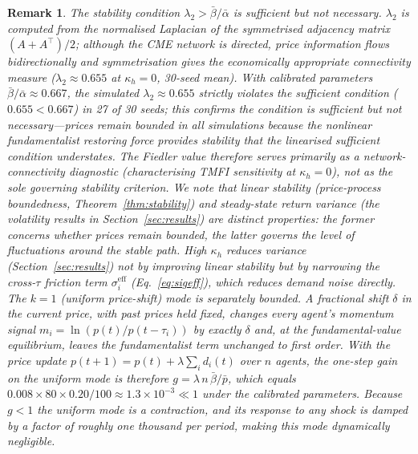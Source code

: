 \documentclass[preprint,12pt,authoryear]{elsarticle}
\newtheorem{remark}{Remark}
\begin{document}
\begin{remark}
The stability condition $\lambda_2 > \bar{\beta}/\bar{\alpha}$ is
\emph{sufficient but not necessary}.
$\lambda_2$ is computed from the normalised Laplacian of the symmetrised
adjacency matrix $(A + A^\top)/2$; although the CME network is directed,
price information flows bidirectionally and symmetrisation gives the
economically appropriate connectivity measure
($\lambda_2 \approx 0.655$ at $\kappa_h = 0$, 30-seed mean).
With calibrated parameters $\bar{\beta}/\bar{\alpha} \approx 0.667$, the
simulated $\lambda_2 \approx 0.655$ strictly violates the sufficient
condition ($0.655 < 0.667$) in 27 of 30 seeds; this confirms the condition
is sufficient but not necessary---prices remain bounded in all simulations
because the nonlinear fundamentalist restoring force provides stability that
the linearised sufficient condition understates.
The Fiedler value therefore serves primarily as a network-connectivity
diagnostic (characterising TMFI sensitivity at $\kappa_h = 0$), not as
the sole governing stability criterion.
We note that linear stability (price-process boundedness, Theorem~\ref{thm:stability})
and steady-state return variance (the volatility results in Section~\ref{sec:results})
are distinct properties: the former concerns whether prices remain bounded,
the latter governs the level of fluctuations around the stable path.
High $\kappa_h$ reduces variance (Section~\ref{sec:results}) not by
improving linear stability but by narrowing the cross-$\tau$ friction term
$\sigma_i^{\text{eff}}$ (Eq.~\eqref{eq:sigeff}), which reduces demand noise
directly.
The $k = 1$ (uniform price-shift) mode is separately bounded.
A fractional shift $\delta$ in the current price, with past prices held fixed,
changes every agent's momentum signal $m_i = \ln(p(t)/p(t-\tau_i))$ by exactly
$\delta$ and, at the fundamental-value equilibrium, leaves the fundamentalist
term unchanged to first order.
With the price update $p(t{+}1) = p(t) + \lambda\sum_i d_i(t)$ over $n$ agents,
the one-step gain on the uniform mode is therefore
$g = \lambda\,n\,\bar{\beta}/\bar{p}$, which equals
$0.008 \times 80 \times 0.20 / 100 \approx 1.3\times 10^{-3} \ll 1$ under the
calibrated parameters.
Because $g < 1$ the uniform mode is a contraction, and its response to any
shock is damped by a factor of roughly one thousand per period, making this mode
dynamically negligible.
\end{remark}
\end{document}

